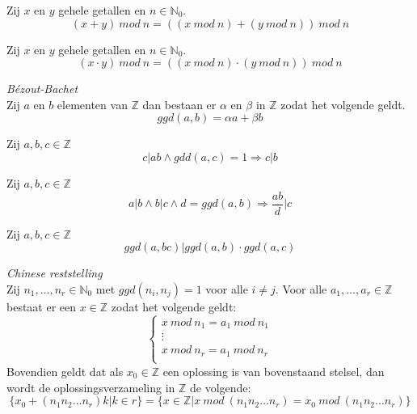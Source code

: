 \documentclass[main.tex]{subfiles}
\begin{document}
\begin{st}
  Zij $x$ en $y$ gehele getallen en $n\in \mathbb{N}_{0}$.
  \[ (x+y)\ mod\ n = ((x\ mod\ n)+(y\ mod\ n))\ mod\ n \]

\end{st}

\begin{st}
  Zij $x$ en $y$ gehele getallen en $n\in \mathbb{N}_{0}$.
  \[ (x\cdot y)\ mod\ n = ((x\ mod\ n)\cdot(y\ mod\ n))\ mod\ n \]

\end{st}


\begin{st}
  \label{st:bezout-bachet}
  \emph{B\'ezout-Bachet}\\
  Zij $a$ en $b$ elementen van $\mathbb{Z}$ dan bestaan er $\alpha$ en $\beta$ in $\mathbb{Z}$ zodat het volgende geldt.
  \[ ggd(a,b) = \alpha a + \beta b \]

\end{st}

\begin{st}
  Zij $a,b,c \in \mathbb{Z}$
  \[ c|ab \wedge gdd(a,c) = 1 \Rightarrow c|b \]

\end{st}

\begin{st}
  Zij $a,b,c \in \mathbb{Z}$
  \[ a|b \wedge b|c \wedge d=ggd(a,b) \Rightarrow \frac{ab}{d}|c \]

\end{st}

\begin{st}
  Zij $a,b,c \in \mathbb{Z}$
  \[ ggd(a,bc)|ggd(a,b)\cdot ggd(a,c) \]

\end{st}

\begin{st}
  \emph{Chinese reststelling}\\
  Zij $n_{1},\dotsc,n_{r} \in \mathbb{N}_{0}$ met $ggd(n_{i},n_{j}) = 1$ voor alle $i\neq j$.
  Voor alle $a_{1},\dotsc,a_{r} \in \mathbb{Z}$ bestaat er een $x \in \mathbb{Z}$ zodat het volgende geldt:
  \[
  \left\{
    \begin{array}{rl}
    x\ mod\ n_{1} = a_{1}\ mod\ n_{1}\\
    \vdots\\
    x\ mod\ n_{r} = a_{1}\ mod\ n_{r}\\
  \end{array}
  \right.
  \]
  Bovendien geldt dat als $x_{0} \in \mathbb{Z}$ een oplossing is van bovenstaand stelsel, dan wordt de oplossingsverzameling in $\mathbb{Z}$ de volgende:
  \[ \{ x_{0} + (n_{1}n_{2}\dotsc n_{r})k | k \in r\} = \{ x \in \mathbb{Z} | x\ mod\ (n_{1}n_{2}\dotsc n_{r}) = x_{0}\ mod\ (n_{1}n_{2}\dotsc n_{r}) \}\]

\end{st}
\end{document}
